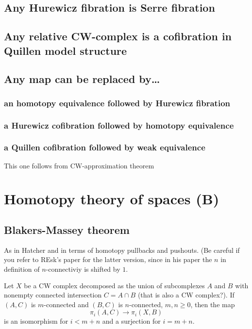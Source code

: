 \begin{remark}
\subsection{Any Hurewicz fibration is Serre fibration}
\subsection{Any relative CW-complex is a cofibration in Quillen model structure}
\subsection{Any map can be replaced by…} 
\subsubsection{an homotopy equivalence followed by Hurewicz fibration}
\subsubsection{a Hurewicz cofibration followed by homotopy equivalence}
\subsubsection{a Quillen cofibration followed by weak equivalence}
This one follows from CW-approximation theorem

\section{Homotopy theory  of spaces (B)}

\subsection{Blakers-Massey theorem}

As in Hatcher and in terms of homotopy pullbacks and pushouts. (Be careful if you refer to REsk's paper for the latter version, since in his paper the $n$ in definition of $n$-connectiviy is shifted by $1$.
\begin{thm}
	Let $X$ be a CW complex decomposed as the union of subcomplexes $A$ and $B$ with nonempty connected intersection $C=A\cap B$ {\color{magenta}(that is also a CW complex?)}. If $(A,C)$ is $m$-connected and $(B,C)$ is $n$-connected, $m,n\geq 0$, then the map
	\[\pi_{i}(A,C)\to \pi_{i}(X,B)\]
is an isomorphism for $i<m+n$ and a surjection for $i=m+n$.
\end{thm}


\end{remark}
